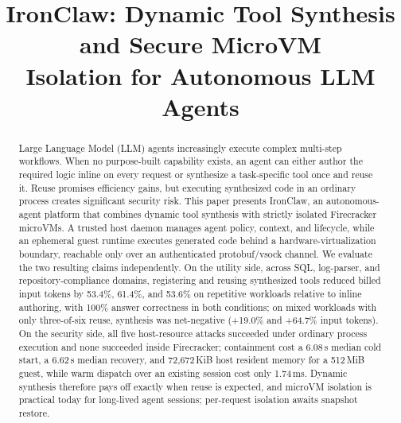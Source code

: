 \documentclass[conference]{IEEEtran}
\newcommand{\toolname}{IronClaw}
\begin{document}
\title{IronClaw: Dynamic Tool Synthesis and Secure MicroVM\\Isolation for
Autonomous LLM Agents}

\author{
}

\maketitle

\begin{abstract}
Large Language Model (LLM) agents increasingly execute complex multi-step
workflows. When no purpose-built capability exists, an agent can either author
the required logic inline on every request or synthesize a task-specific tool
once and reuse it. Reuse promises efficiency gains, but executing synthesized
code in an ordinary process creates significant security risk. This paper
presents \toolname, an autonomous-agent platform that combines dynamic tool
synthesis with strictly isolated Firecracker microVMs. A trusted host daemon
manages agent policy, context, and lifecycle, while an ephemeral guest runtime
executes generated code behind a hardware-virtualization boundary, reachable
only over an authenticated protobuf/vsock channel. We evaluate the two
resulting claims independently. On the utility side, across SQL, log-parser,
and repository-compliance domains, registering and reusing synthesized tools
reduced billed input tokens by 53.4\%, 61.4\%, and 53.6\% on repetitive
workloads relative to inline authoring, with 100\% answer correctness in both
conditions; on mixed workloads with only three-of-six reuse, synthesis was
net-negative (+19.0\% and +64.7\% input tokens). On the security side, all
five host-resource attacks succeeded under ordinary process execution and none
succeeded inside Firecracker; containment cost a 6.08\,s median cold start, a
6.62\,s median recovery, and 72{,}672\,KiB host resident memory for a
512\,MiB guest, while warm dispatch over an existing session cost only
1.74\,ms. Dynamic synthesis therefore pays off exactly when reuse is expected,
and microVM isolation is practical today for long-lived agent sessions;
per-request isolation awaits snapshot restore.
\end{abstract}
\end{document}

